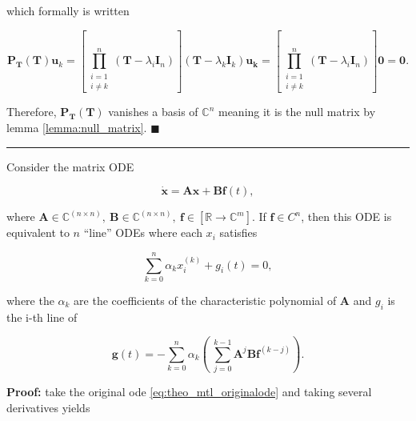 	\noindent which formally is written

\begin{equation} \mathbf{P_\mathbf{T}}\left(\mathbf{T}\right)\mathbf{u}_k = \left[\prod_{\substack{i=1 \\ i\neq k} }^n \left(\mathbf{T} - \lambda_i\mathbf{I}_n\right)\right]\left(\mathbf{T} - \lambda_k\mathbf{I}_k\right)\mathbf{u_k} = \left[\prod_{\substack{i=1 \\ i\neq k} }^n \left(\mathbf{T} - \lambda_i\mathbf{I}_n\right)\right]\mathbf{0} = \mathbf{0}.\end{equation}

	Therefore, $\mathbf{P_\mathbf{T}}\left(\mathbf{T}\right)$ vanishes a basis of $\mathbb{C}^n$ meaning it is the null matrix by lemma \ref{lemma:null_matrix}.
\hfill$\blacksquare$
\vspace{5mm}
\hrule
\vspace{5mm} %

\begin{theorem} \label{theorem:ode_matrix_equiv} %

	Consider the matrix ODE

\begin{equation} \dot{\mathbf{x}} = \mathbf{Ax} + \mathbf{B}\mathbf{f}(t), \label{eq:theo_mtl_originalode}\end{equation}

	\noindent where $\mathbf{A}\in\mathbb{C}^{(n\times n)},\ \mathbf{B}\in\mathbb{C}^{(n\times n)},\ \mathbf{f}\in\left[\mathbb{R}\to\mathbb{C}^m\right]$. If $\mathbf{f}\in C^n$, then this ODE is equivalent to $n$ ``line'' ODEs where each $x_i$ satisfies 

\begin{equation} \sum_{k=0}^n \alpha_k x_i^{(k)} + g_i(t) = 0, \label{eq:theo_nthnonst_end}\end{equation}

	\noindent where the $\alpha_k$ are the coefficients of the characteristic polynomial of $\mathbf{A}$ and  $g_i$ is the i-th line of

\begin{equation} \mathbf{g}(t) = -\sum_{k=0}^n \alpha_k\left(\ \sum_{j=0}^{k-1} \mathbf{A}^j\mathbf{B}\mathbf{f}^{(k-j)}\right) . \label{eq:theo_nthnonst_g}\end{equation}

\end{theorem}
\noindent\textbf{Proof:} take the original ode \eqref{eq:theo_mtl_originalode} and taking several derivatives yields

